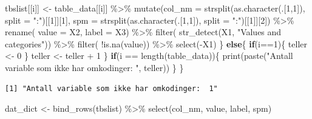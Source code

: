 \documentclass[
  norsk,
  letterpaper,
  DIV=11,
  numbers=noendperiod]{scrreprt}
\newenvironment{Shaded}{\begin{snugshade}}{\end{snugshade}}
\newcommand{\AttributeTok}[1]{\textcolor[rgb]{0.40,0.45,0.13}{#1}}
\newcommand{\ControlFlowTok}[1]{\textcolor[rgb]{0.00,0.23,0.31}{\textbf{#1}}}
\newcommand{\DecValTok}[1]{\textcolor[rgb]{0.68,0.00,0.00}{#1}}
\newcommand{\FunctionTok}[1]{\textcolor[rgb]{0.28,0.35,0.67}{#1}}
\newcommand{\NormalTok}[1]{\textcolor[rgb]{0.00,0.23,0.31}{#1}}
\newcommand{\OtherTok}[1]{\textcolor[rgb]{0.00,0.23,0.31}{#1}}
\newcommand{\SpecialCharTok}[1]{\textcolor[rgb]{0.37,0.37,0.37}{#1}}
\newcommand{\StringTok}[1]{\textcolor[rgb]{0.13,0.47,0.30}{#1}}
\theoremstyle{definition}
\theoremstyle{remark}
\begin{document}
\begin{Shaded}
\begin{Highlighting}[]
\NormalTok{    tbslist[[i]] }\OtherTok{\textless{}{-}}\NormalTok{ table\_data[[i]] }\SpecialCharTok{\%\textgreater{}\%} 
      \FunctionTok{mutate}\NormalTok{(}\AttributeTok{col\_nm =} \FunctionTok{strsplit}\NormalTok{(}\FunctionTok{as.character}\NormalTok{(.[}\DecValTok{1}\NormalTok{,}\DecValTok{1}\NormalTok{]), }\AttributeTok{split =} \StringTok{":"}\NormalTok{)[[}\DecValTok{1}\NormalTok{]][}\DecValTok{1}\NormalTok{],}
             \AttributeTok{spm =} \FunctionTok{strsplit}\NormalTok{(}\FunctionTok{as.character}\NormalTok{(.[}\DecValTok{1}\NormalTok{,}\DecValTok{1}\NormalTok{]), }\AttributeTok{split =} \StringTok{":"}\NormalTok{)[[}\DecValTok{1}\NormalTok{]][}\DecValTok{2}\NormalTok{]) }\SpecialCharTok{\%\textgreater{}\%} 
      \FunctionTok{rename}\NormalTok{( }\AttributeTok{value =}\NormalTok{ X2, }
              \AttributeTok{label =}\NormalTok{ X3) }\SpecialCharTok{\%\textgreater{}\%}
      \FunctionTok{filter}\NormalTok{( }\FunctionTok{str\_detect}\NormalTok{(X1, }\StringTok{"Values and categories"}\NormalTok{)) }\SpecialCharTok{\%\textgreater{}\%} 
      \FunctionTok{filter}\NormalTok{( }\SpecialCharTok{!}\FunctionTok{is.na}\NormalTok{(value)) }\SpecialCharTok{\%\textgreater{}\%} 
      \FunctionTok{select}\NormalTok{(}\SpecialCharTok{{-}}\NormalTok{X1)}
\NormalTok{  \}}
  \ControlFlowTok{else}\NormalTok{\{}
    \ControlFlowTok{if}\NormalTok{(i}\SpecialCharTok{==}\DecValTok{1}\NormalTok{)\{}
\NormalTok{      teller }\OtherTok{\textless{}{-}} \DecValTok{0}
\NormalTok{      \}}
\NormalTok{    teller }\OtherTok{\textless{}{-}}\NormalTok{ teller }\SpecialCharTok{+} \DecValTok{1} 
\NormalTok{  \}}
  \ControlFlowTok{if}\NormalTok{(i }\SpecialCharTok{==} \FunctionTok{length}\NormalTok{(table\_data))\{}
    \FunctionTok{print}\NormalTok{(}\FunctionTok{paste}\NormalTok{(}\StringTok{"Antall variable som ikke har omkodinger: "}\NormalTok{, teller)) }
\NormalTok{  \}}
\NormalTok{\}}
\end{Highlighting}
\end{Shaded}

\begin{verbatim}
[1] "Antall variable som ikke har omkodinger:  1"
\end{verbatim}

\begin{Shaded}
\begin{Highlighting}[]
\NormalTok{dat\_dict }\OtherTok{\textless{}{-}} \FunctionTok{bind\_rows}\NormalTok{(tbslist) }\SpecialCharTok{\%\textgreater{}\%} 
  \FunctionTok{select}\NormalTok{(col\_nm, value, label, spm)}
\end{Highlighting}
\end{Shaded}
\end{document}
